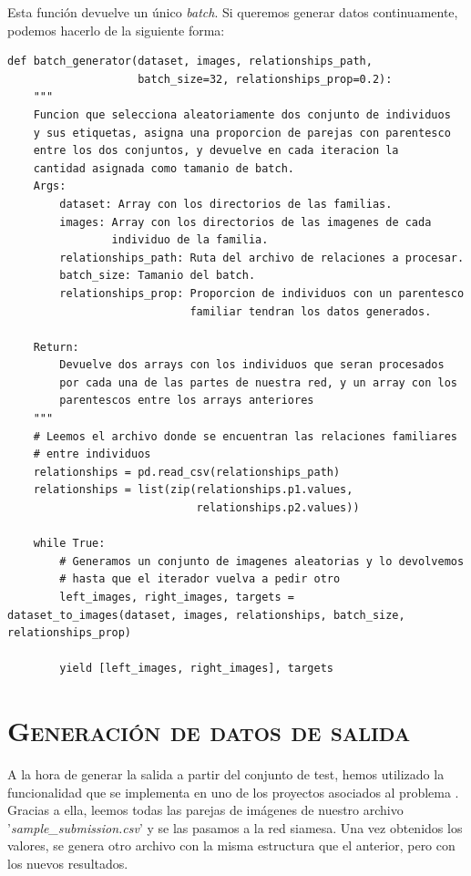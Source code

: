 \documentclass[11pt,a4paper]{article}
\begin{document}
Esta función devuelve un único \textit{batch}. Si queremos generar datos continuamente, podemos hacerlo
de la siguiente forma:

\begin{lstlisting}
def batch_generator(dataset, images, relationships_path,
                    batch_size=32, relationships_prop=0.2):
    """
    Funcion que selecciona aleatoriamente dos conjunto de individuos
    y sus etiquetas, asigna una proporcion de parejas con parentesco
    entre los dos conjuntos, y devuelve en cada iteracion la
    cantidad asignada como tamanio de batch.
    Args:
        dataset: Array con los directorios de las familias.
        images: Array con los directorios de las imagenes de cada
                individuo de la familia.
        relationships_path: Ruta del archivo de relaciones a procesar.
        batch_size: Tamanio del batch.
        relationships_prop: Proporcion de individuos con un parentesco
                            familiar tendran los datos generados.
    
    Return:
        Devuelve dos arrays con los individuos que seran procesados
        por cada una de las partes de nuestra red, y un array con los
        parentescos entre los arrays anteriores
    """
    # Leemos el archivo donde se encuentran las relaciones familiares
    # entre individuos
    relationships = pd.read_csv(relationships_path)
    relationships = list(zip(relationships.p1.values,
                             relationships.p2.values))
    
    while True:
        # Generamos un conjunto de imagenes aleatorias y lo devolvemos
        # hasta que el iterador vuelva a pedir otro
        left_images, right_images, targets = dataset_to_images(dataset, images, relationships, batch_size, relationships_prop)

        yield [left_images, right_images], targets
\end{lstlisting}


\section{\textsc{Generación de datos de salida}}

A la hora de generar la salida a partir del conjunto de test, hemos utilizado la funcionalidad que se implementa
en uno de los proyectos asociados al problema \cite{project}. Gracias a ella, leemos todas las parejas de imágenes de
nuestro archivo '\textit{sample\_submission.csv}' y se las pasamos a la red siamesa. Una vez obtenidos
los valores, se genera otro archivo con la misma estructura que el anterior, pero con los nuevos resultados.
\end{document}
